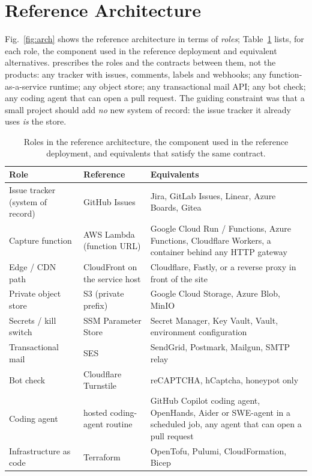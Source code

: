 \section{Reference Architecture}\label{sec:arch}
Fig.~\ref{fig:arch} shows the reference architecture in terms of \emph{roles}; Table~\ref{tab:roles} lists, for each role, the component used in the reference deployment and equivalent alternatives. \ffrs{} prescribes the roles and the contracts between them, not the products: any tracker with issues, comments, labels and webhooks; any function-as-a-service runtime; any object store; any transactional mail API; any bot check; any coding agent that can open a pull request. The guiding constraint was that a small project should add \emph{no} new system of record: the issue tracker it already uses \emph{is} the store.

\begin{table}[t]
\centering\footnotesize
\caption{Roles in the reference architecture, the component used in the reference deployment, and equivalents that satisfy the same contract.}
\label{tab:roles}
\begin{tabular}{@{}p{2.4cm}>{\raggedright\arraybackslash}p{2.1cm}>{\raggedright\arraybackslash}p{3.3cm}@{}}
\toprule
Role & Reference & Equivalents \\
\midrule
Issue tracker (system of record) & GitHub Issues & Jira, GitLab Issues, Linear, Azure Boards, Gitea \\
Capture function & AWS Lambda (function URL) & Google Cloud Run / Functions, Azure Functions, Cloudflare Workers, a container behind any HTTP gateway \\
Edge / CDN path & CloudFront on the service host & Cloudflare, Fastly, or a reverse proxy in front of the site \\
Private object store & S3 (private prefix) & Google Cloud Storage, Azure Blob, MinIO \\
Secrets / kill switch & SSM Parameter Store & Secret Manager, Key Vault, Vault, environment configuration \\
Transactional mail & SES & SendGrid, Postmark, Mailgun, SMTP relay \\
Bot check & Cloudflare Turnstile & reCAPTCHA, hCaptcha, honeypot only \\
Coding agent & hosted coding-agent routine & GitHub Copilot coding agent, OpenHands, Aider or SWE-agent in a scheduled job, any agent that can open a pull request \\
Infrastructure as code & Terraform & OpenTofu, Pulumi, CloudFormation, Bicep \\
\bottomrule
\end{tabular}
\end{table}

